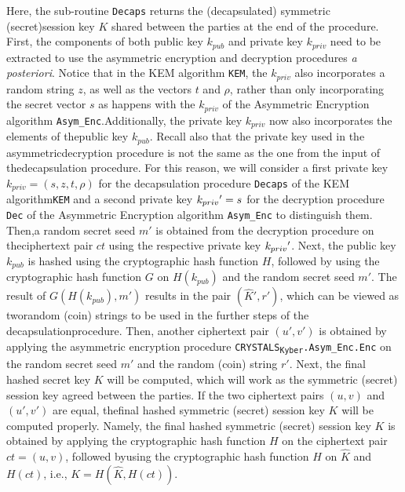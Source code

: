 \documentclass[runningheads]{llncs}
\numberwithin{equation}{section}
\begin{document}
    \vspace{-2ex}

    \noindent Here, the sub-routine \texttt{Decaps} returns the (decapsulated) symmetric (secret)\break session key $K$ shared between the parties at the end of the procedure. First, the components of both public key ${k}_{pub}$ and private key ${k}_{priv}$ need to be extracted to use the asymmetric encryption and decryption procedures \textit{a posteriori}. Notice that in the KEM algorithm \texttt{KEM}, the ${k}_{priv}$ also incorporates a random string $z$, as well as the vectors $t$ and $\rho$, rather than only incorporating the secret vector $s$ as happens with the ${k}_{priv}$ of the Asymmetric Encryption algorithm \texttt{Asym\_Enc}.\break Additionally, the private key ${k}_{priv}$ now also incorporates the elements of the\break public key ${k}_{pub}$. Recall also that the private key used in the asymmetric\break decryption procedure is not the same as the one from the input of the\break decapsulation procedure. For this reason, we will consider a first private key ${k}_{priv} = (s, z, t, \rho)$ for the decapsulation procedure \texttt{Decaps} of the KEM algorithm\break \texttt{KEM} and a second private key ${k}_{priv}\/' = s$ for the decryption procedure \texttt{Dec} of the Asymmetric Encryption algorithm \texttt{Asym\_Enc} to distinguish them. Then,\break a random secret seed $m'$ is obtained from the decryption procedure on the\break ciphertext pair $ct$ using the respective private key ${k}_{priv}\/'$. Next, the public key ${k}_{pub}$ is hashed using the cryptographic hash function $H$, followed by using the cryptographic hash function $G$ on $H({k}_{pub})$ and the random secret seed $m'$. The result of $G(H({k}_{pub}), m')$ results in the pair $(\hat{K}', r')$, which can be viewed as two\break random (coin) strings to be used in the further steps of the decapsulation\break procedure. Then, another ciphertext pair $(u',v')$ is obtained by applying the asymmetric encryption procedure \texttt{CRYSTALS}\textsubscript{\texttt{Kyber}}\texttt{.Asym\_Enc}\texttt{.Enc} on the random secret seed $m'$ and the random (coin) string $r'$. Next, the final hashed secret key $K$ will be computed, which will work as the symmetric (secret) session key agreed between the parties. If the two ciphertext pairs $(u,v)$ and $(u',v')$ are equal, the\break final hashed symmetric (secret) session key $K$ will be computed properly. Namely, the final hashed symmetric (secret) session key $K$ is obtained by applying the cryptographic hash function $H$ on the ciphertext pair $ct = (u,v)$, followed by\break using the cryptographic hash function $H$ on $\hat{K}$ and $H(ct)$, i.e., $K = H(\hat{K}, H(ct))$.
\end{document}
